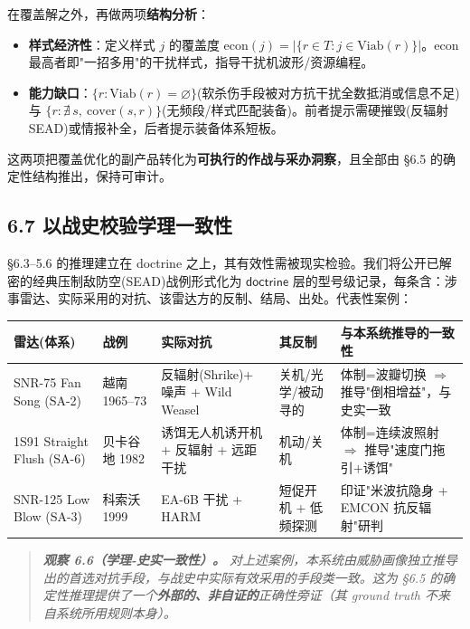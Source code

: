 \documentclass[12pt,a4paper]{ctexart}
\begin{document}
在覆盖解之外，再做两项\textbf{结构分析}：

\begin{itemize}[leftmargin=2em]
\item \textbf{样式经济性}：定义样式 $j$ 的覆盖度 $\mathrm{econ}(j)=\big|\{r\in T:j\in\mathrm{Viab}(r)\}\big|$。$\mathrm{econ}$ 最高者即"一招多用"的干扰样式，指导干扰机波形/资源编程。
\item \textbf{能力缺口}：$\{r:\mathrm{Viab}(r)=\varnothing\}$(软杀伤手段被对方抗干扰全数抵消或信息不足)与 $\{r:\nexists\,s,\ \mathrm{cover}(s,r)\}$(无频段/样式匹配装备)。前者提示需硬摧毁(反辐射 SEAD)或情报补全，后者提示装备体系短板。
\end{itemize}

这两项把覆盖优化的副产品转化为\textbf{可执行的作战与采办洞察}，且全部由 §6.5 的确定性结构推出，保持可审计。


\subsection*{6.7 以战史校验学理一致性}

§6.3–5.6 的推理建立在 doctrine 之上，其有效性需被现实检验。我们将公开已解密的经典压制敌防空(SEAD)战例形式化为 $\textsf{doctrine}$ 层的型号级记录，每条含：涉事雷达、实际采用的对抗、该雷达方的反制、结局、出处。代表性案例：

\begin{center}\small
\begin{tabular}{|p{}|p{}|p{}|p{}|p{}|}
\hline
\textbf{雷达(体系)} & \textbf{战例} & \textbf{实际对抗} & \textbf{其反制} & \textbf{与本系统推导的一致性} \\ \hline
SNR-75 Fan Song (SA-2) & 越南 1965–73 & 反辐射(Shrike)+ 噪声 + Wild Weasel & 关机/光学/被动寻的 & 体制=波瓣切换 $\Rightarrow$ 推导"倒相增益"，与史实一致 \\ \hline
1S91 Straight Flush (SA-6) & 贝卡谷地 1982 & 诱饵无人机诱开机 + 反辐射 + 远距干扰 & 机动/关机 & 体制=连续波照射 $\Rightarrow$ 推导"速度门拖引+诱饵" \\ \hline
SNR-125 Low Blow (SA-3) & 科索沃 1999 & EA-6B 干扰 + HARM & 短促开机 + 低频探测 & 印证"米波抗隐身 + EMCON 抗反辐射"研判 \\ \hline
\end{tabular}
\end{center}

\begin{quote}\itshape \textbf{观察 6.6（学理-史实一致性）。} 对上述案例，本系统由威胁画像独立推导出的首选对抗手段，与战史中实际有效采用的手段类一致。这为 §6.5 的确定性推理提供了一个\textbf{外部的、非自证的}正确性旁证（其 ground truth 不来自系统所用规则本身）。\end{quote}
\end{document}

